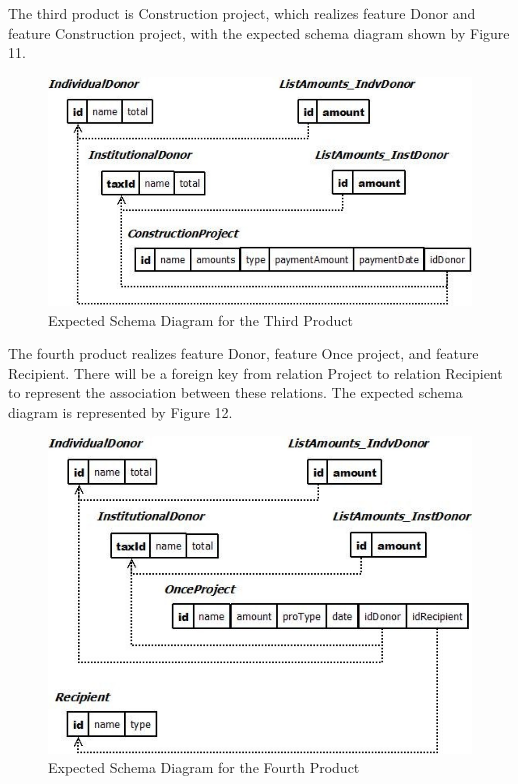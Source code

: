 \documentclass[runningheads,a4paper]{llncs}
\begin{document}
The third product is Construction project, which realizes feature Donor and feature Construction project, with the expected schema diagram shown by Figure 11.

\begin{figure}
	\centering
	\includegraphics[scale=0.7]{db6.jpg}
	\caption{Expected Schema Diagram for the Third Product}
	\label{Figure 11}
\end{figure}

The fourth product realizes feature Donor, feature Once project, and feature Recipient. There will be a foreign key from relation Project to relation Recipient to represent the association between these relations. The expected schema diagram is represented by Figure 12.

\begin{figure}
	\centering
	\includegraphics[scale=0.7]{db7.jpg}
	\caption{Expected Schema Diagram for the Fourth Product}
	\label{Figure 12}
\end{figure}
\end{document}
